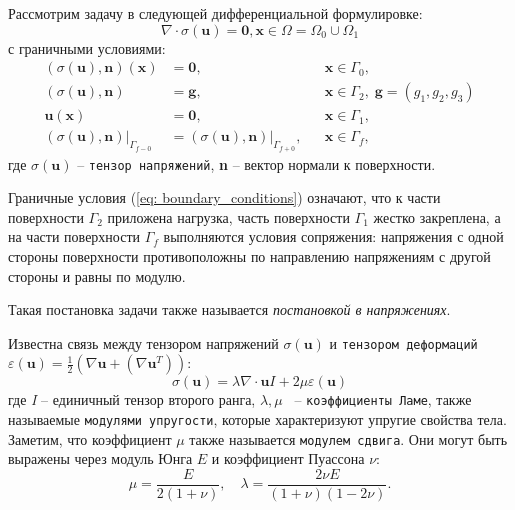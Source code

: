 \documentclass[a4paper, 14pt]{extreport}
\begin{document}
Рассмотрим задачу в следующей дифференциальной формулировке:
\begin{equation}
	\label{eq:1}
	\nabla\!\cdot\!\sigma(\textbf{u}) = \textbf{0}, \textbf{x} \in \Omega = \Omega_0 \cup \Omega_1
\end{equation}
с граничными условиями:
\begin{equation}
	\label{eq: boundary_conditions}
	\begin{aligned}
		(\sigma(\textbf{u}), \textbf{n})(\textbf{x}) 	  	  &= \textbf{0},   &&\textbf{x} \in \Gamma_0,\\
		(\sigma(\textbf{u}), \textbf{n}) 				  	  &= \textbf{g},   &&\textbf{x} \in \Gamma_2, \; \textbf{g} = (g_1, g_2, g_3)\\
		\textbf{u}(\textbf{x})							  	  &= \textbf{0},	   &&\textbf{x} \in \Gamma_1,\\
		(\sigma(\textbf{u}), \textbf{n})\vert_{\Gamma_{f - 0}} &= 
			(\sigma(\textbf{u}), \textbf{n})\vert_{\Gamma_{f + 0}},             &&\textbf{x} \in \Gamma_f,
	\end{aligned}
\end{equation}
где $\sigma(\textbf{u})$  -- \texttt{тензор напряжений}, \textbf{n} -- вектор нормали
к поверхности. 

Граничные условия (\ref{eq: boundary_conditions}) означают, что к части поверхности 
$\Gamma_2$ приложена нагрузка, часть поверхности $\Gamma_1$ жестко закреплена, 
а на части поверхности $\Gamma_f$ выполняются условия сопряжения: напряжения 
с одной стороны поверхности противоположны по направлению напряжениям с 
другой стороны и равны по модулю.

Такая постановка задачи также называется \textit{постановкой в напряжениях}.

Известна связь между тензором напряжений $\sigma(\textbf{u})$ и \texttt{тензором деформаций}
$\varepsilon(\textbf{u}) = \frac{1}{2}(\nabla\textbf{u} + (\nabla\textbf{u}^T))$:
\begin{equation*}
\sigma(\textbf{u}) = \lambda \nabla\!\cdot\!\textbf{u}\textit{I} + 2\mu\varepsilon(\textbf{u})
\end{equation*}
где \textit{I} -- единичный тензор второго ранга,
$\lambda, \mu $ \, -- \texttt{коэффициенты Ламе}, также называемые 
\texttt{модулями упругости}, которые характеризуют упругие свойства тела. Заметим, что коэффициент $\mu$ также называется \texttt{модулем сдвига}. Они могут быть выраже­ны через модуль Юнга $E$ и коэффициент Пуассона $\nu$:
\begin{equation}
	\label{eq: young_puasson}
\mu = \frac{E}{2(1 + \nu)}, \quad \lambda = \frac{2\nu E}{(1 + \nu)(1 - 2\nu)}.
\end{equation}
\end{document}
